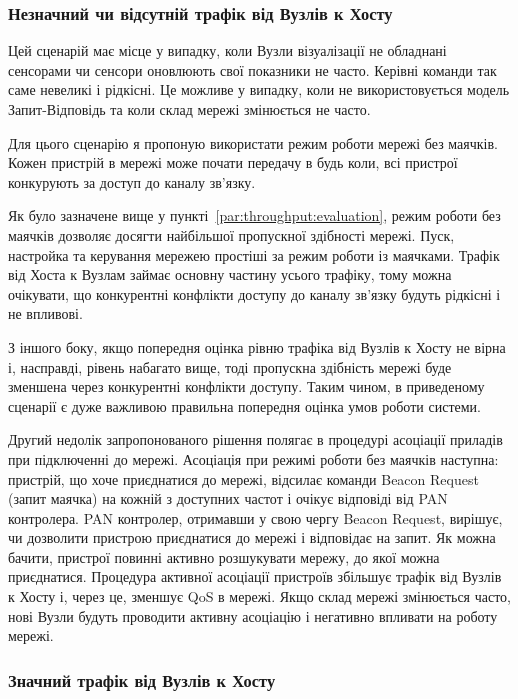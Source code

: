 \documentclass[a4paper,ukrainian,utf8,nocolumnsxix,floatsection]{eskdtext}
\renewcommand\paragraph{\subsubsection}
\begin{document}
\paragraph{Незначний чи відсутній трафік від Вузлів к Хосту}
\label{par:low:nthn}

Цей сценарій має місце у випадку, коли Вузли візуалізації не обладнані сенсорами чи сенсори оновлюють свої показники не часто. Керівні команди так саме невеликі і рідкісні. Це можливе у випадку, коли не використовується модель Запит-Відповідь та коли склад мережі змінюється не часто.

Для цього сценарію я пропоную використати режим роботи мережі без маячків. Кожен пристрій в мережі може почати передачу в будь коли, всі пристрої конкурують за доступ до каналу зв’язку. 

Як було зазначене вище у пункті~\ref{par:throughput:evaluation}, режим роботи без маячків дозволяє досягти найбільшої пропускної здібності мережі. Пуск, настройка та керування мережею простіші за режим роботи із маячками. Трафік від Хоста к Вузлам займає основну частину усього трафіку, тому можна очікувати, що конкурентні конфлікти доступу до каналу зв’язку будуть рідкісні і не впливові.

З іншого боку, якщо попередня оцінка рівню трафіка від Вузлів к Хосту не вірна і, насправді, рівень набагато вище, тоді пропускна здібність мережі буде зменшена через конкурентні конфлікти доступу. Таким чином, в приведеному сценарії є дуже важливою правильна попередня оцінка умов роботи системи.

Другий недолік запропонованого рішення полягає в процедурі асоціації приладів при підключенні до мережі. Асоціація при режимі роботи без маячків наступна: пристрій, що хоче приєднатися до мережі, відсилає команди Beacon Request (запит маячка) на кожній з доступних частот і очікує відповіді від PAN контролера. PAN контролер, отримавши  у свою чергу Beacon Request, вирішує, чи дозволити пристрою приєднатися до мережі і відповідає на запит. Як можна бачити, пристрої повинні активно розшукувати мережу, до якої можна приєднатися. Процедура активної асоціації пристроїв збільшує трафік від Вузлів к Хосту і, через це, зменшує QoS в мережі. Якщо склад мережі змінюється часто, нові Вузли будуть проводити активну асоціацію і негативно впливати на роботу мережі.

\paragraph{Значний трафік від Вузлів к Хосту}
\label{par:low:ntht}
\end{document}
